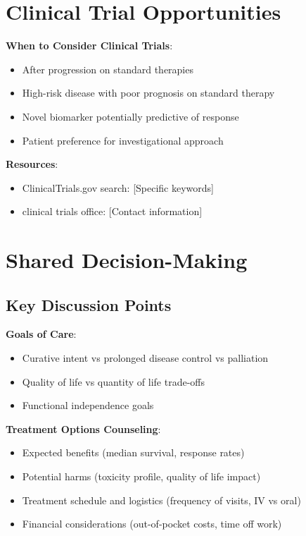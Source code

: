 \documentclass[10pt,letterpaper]{article}
\begin{document}
\section{Clinical Trial Opportunities}

\textbf{When to Consider Clinical Trials}:
\begin{itemize}
\item After progression on standard therapies
\item High-risk disease with poor prognosis on standard therapy
\item Novel biomarker potentially predictive of response
\item Patient preference for investigational approach
\end{itemize}

\textbf{Resources}:
\begin{itemize}
\item ClinicalTrials.gov search: [Specific keywords]
\item [Institution] clinical trials office: [Contact information]
\end{itemize}

\section{Shared Decision-Making}

\subsection{Key Discussion Points}

\textbf{Goals of Care}:
\begin{itemize}
\item Curative intent vs prolonged disease control vs palliation
\item Quality of life vs quantity of life trade-offs
\item Functional independence goals
\end{itemize}

\textbf{Treatment Options Counseling}:
\begin{itemize}
\item Expected benefits (median survival, response rates)
\item Potential harms (toxicity profile, quality of life impact)
\item Treatment schedule and logistics (frequency of visits, IV vs oral)
\item Financial considerations (out-of-pocket costs, time off work)
\end{itemize}
\end{document}
